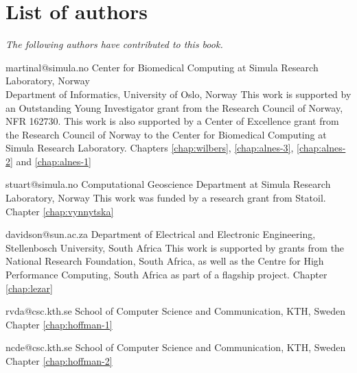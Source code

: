 \chapter*{List of authors}
\addtocounter{chapter}{1}
\vspace{-1cm}

\emph{The following authors have contributed to this book.}

\vspace{1cm}

             {martinal@simula.no}
             {Center for Biomedical Computing at Simula Research Laboratory, Norway \\
              Department of Informatics, University of Oslo, Norway}
             {This work is supported by an Outstanding Young
              Investigator grant from the Research Council of Norway,
              NFR 162730.
              This work is also supported by a Center of Excellence grant
              from the Research Council of Norway to the Center for
              Biomedical Computing at Simula Research Laboratory.}
             {Chapters
              \ref{chap:wilbers},
              \ref{chap:alnes-3},
              \ref{chap:alnes-2} and
              \ref{chap:alnes-1}}

             {stuart@simula.no}
             {Computational Geoscience Department at Simula Research Laboratory, Norway}
             {This work was funded by a research grant from Statoil.}
             {Chapter \ref{chap:vynnytska}}

             {davidson@sun.ac.za}
             {Department of Electrical and Electronic Engineering, Stellenbosch University, South Africa}
             {This work is supported by grants from the National Research
              Foundation, South Africa, as well as the Centre for High Performance
              Computing, South Africa as part of a flagship project.}
             {Chapter \ref{chap:lezar}}

             {rvda@csc.kth.se}
             {School of Computer Science and Communication, KTH, Sweden}
             {}
             {Chapter \ref{chap:hoffman-1}}

             {ncde@csc.kth.se}
             {School of Computer Science and Communication, KTH, Sweden}
             {}
             {Chapter \ref{chap:hoffman-2}}

